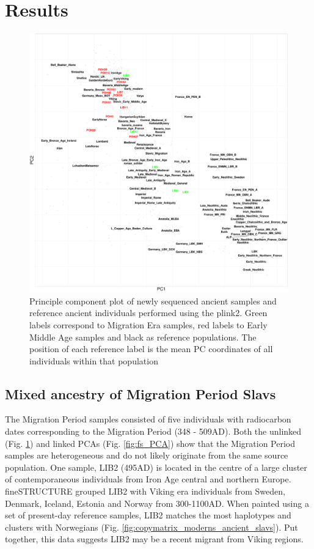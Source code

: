 \section{Results}


\begin{figure}[htp]
    \centering
    \includegraphics[width=1.0\textwidth]{../images/chapter5/plink_pca.pdf}
    \caption{Principle component plot of newly sequenced ancient samples and reference ancient individuals performed using the plink2. Green labels correspond to Migration Era samples, red labels to Early Middle Age samples and black as reference populations. The position of each reference label is the mean PC coordinates of all individuals within that population}
    \label{fig:AllChr.plink_PCA}
\end{figure}


\subsection{Mixed ancestry of Migration Period Slavs}

The Migration Period samples consisted of five individuals with radiocarbon dates corresponding to the Migration Period (348 - 509AD). Both the unlinked (Fig. \ref{fig:AllChr.plink_PCA}) and linked PCAs (Fig. \ref{fig:fs_PCA}) show that the Migration Period samples are heterogeneous and do not likely originate from the same source population. One sample, LIB2 (495AD) is located in the centre of a large cluster of contemporaneous individuals from Iron Age central and northern Europe. fineSTRUCTURE grouped LIB2 with Viking era individuals from Sweden, Denmark, Iceland, Estonia and Norway from 300-1100AD. When painted using a set of present-day reference samples, LIB2 matches the most haplotypes and clusters with Norwegians (Fig. \ref{fig:copymatrix_moderns_ancient_slavs}). Put together, this data suggests LIB2 may be a recent migrant from Viking regions. 

